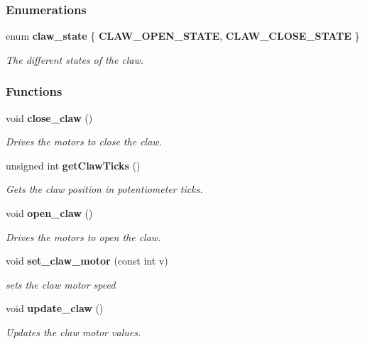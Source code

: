 \subsubsection*{Enumerations}
\begin{DoxyCompactItemize}
\item 
enum \textbf{ claw\+\_\+state} \{ \textbf{ C\+L\+A\+W\+\_\+\+O\+P\+E\+N\+\_\+\+S\+T\+A\+TE}, 
\textbf{ C\+L\+A\+W\+\_\+\+C\+L\+O\+S\+E\+\_\+\+S\+T\+A\+TE}
 \}\begin{DoxyCompactList}\small\item\em The different states of the claw. \end{DoxyCompactList}
\end{DoxyCompactItemize}
\subsubsection*{Functions}
\begin{DoxyCompactItemize}
\item 
void \textbf{ close\+\_\+claw} ()
\begin{DoxyCompactList}\small\item\em Drives the motors to close the claw. \end{DoxyCompactList}\item 
unsigned int \textbf{ get\+Claw\+Ticks} ()
\begin{DoxyCompactList}\small\item\em Gets the claw position in potentiometer ticks. \end{DoxyCompactList}\item 
void \textbf{ open\+\_\+claw} ()
\begin{DoxyCompactList}\small\item\em Drives the motors to open the claw. \end{DoxyCompactList}\item 
void \textbf{ set\+\_\+claw\+\_\+motor} (const int v)
\begin{DoxyCompactList}\small\item\em sets the claw motor speed \end{DoxyCompactList}\item 
void \textbf{ update\+\_\+claw} ()
\begin{DoxyCompactList}\small\item\em Updates the claw motor values. \end{DoxyCompactList}\end{DoxyCompactItemize}


